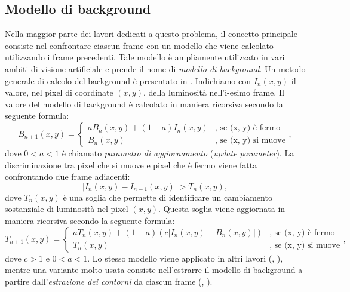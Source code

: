 \subsection{Modello di background}
Nella maggior parte dei lavori dedicati a questo problema, il concetto principale consiste nel confrontare ciascun frame con un modello che viene calcolato utilizzando i frame precedenti.
Tale modello \`e ampliamente utilizzato in vari ambiti di visione artificiale e prende il nome di \textit{modello di background}.
Un metodo generale di calcolo del background \`e presentato in \cite{aksay2007camera}.
Indichiamo con $I_n(x,y)$ il valore, nel pixel di coordinate $(x,y)$, della luminosit\`a nell'i-esimo frame.
Il valore del modello di background \`e calcolato in maniera ricorsiva secondo la seguente formula:
\begin{equation}
\label{eq:background}
B_{n + 1}(x,y)=\left\{ \begin{array} {ll}
aB_n(x,y)+ (1-a)I_n(x,y) & \mbox{, se (x, y) \`e fermo} \\
B_n(x,y) & \mbox{, se (x, y) si muove} \end{array} \right. ,
\end{equation}
dove $0 < a < 1$ \`e chiamato \textit{parametro di aggiornamento} (\textit{update parameter}).
La discriminazione tra pixel che si muove e pixel che \`e fermo viene fatta confrontando due frame adiacenti:
 \begin{equation}
 \label{eq:diffBackground}
|I_n(x,y) - I_{n-1}(x, y)|>T_n(x,y),
 \end{equation}
 dove $T_n(x,y)$ \`e una soglia che permette di identificare un cambiamento sostanziale di luminosit\`a nel pixel $(x,y)$. 
 Questa soglia viene aggiornata in maniera ricorsiva secondo la seguente formula:
  \begin{equation}
  \label{eq:backgroundThreshUpd}
  T_{n + 1}(x,y)=\left\{ \begin{array} {ll}
  aT_n(x,y)+ (1-a)(c |I_n(x,y) - B_n(x,y)|) & \mbox{, se (x, y) \`e fermo} \\
  T_n(x,y) & \mbox{, se (x, y) si muove} \end{array} \right. ,
  \end{equation}
  dove $c > 1$ e $0<a<1$.
  Lo stesso modello viene applicato in altri lavori (\cite{saglam2009real}, \cite{tsesmelis2013tamper}), mentre una variante molto usata consiste nell'estrarre il modello di background a partire dall'\textit{estrazione dei contorni} da ciascun frame (\cite{harasse2004automated}, \cite{gil2007automatic}).
